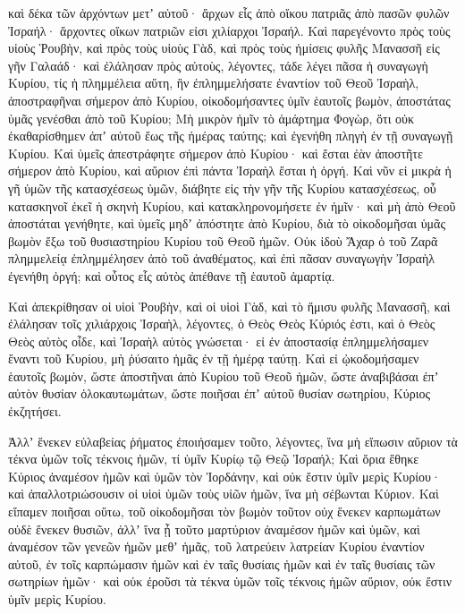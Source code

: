 {καὶ δέκα τῶν ἀρχόντων μετʼ αὐτοῦ· ἄρχων εἷς ἀπὸ οἴκου πατριᾶς ἀπὸ πασῶν φυλῶν Ἰσραήλ· ἄρχοντες οἴκων πατριῶν εἰσι χιλίαρχοι Ἰσραήλ.
Καὶ παρεγένοντο πρὸς τοὺς υἱοὺς Ῥουβὴν, καὶ πρὸς τοὺς υἱοὺς Γὰδ, καὶ πρὸς τοὺς ἡμίσεις φυλῆς Μανασσῆ εἰς γῆν Γαλαάδ· καὶ ἐλάλησαν πρὸς αὐτοὺς, λέγοντες,
τάδε λέγει πᾶσα ἡ συναγωγὴ Κυρίου, τίς ἡ πλημμέλεια αὕτη, ἣν ἐπλημμελήσατε ἐναντίον τοῦ Θεοῦ Ἰσραὴλ, ἀποστραφῆναι σήμερον ἀπὸ Κυρίου, οἰκοδομήσαντες ὑμῖν ἑαυτοῖς βωμὸν, ἀποστάτας ὑμᾶς γενέσθαι ἀπὸ τοῦ Κυρίου;
Μὴ μικρὸν ἡμῖν τὸ ἁμάρτημα Φογὼρ, ὅτι οὐκ ἐκαθαρίσθημεν ἀπʼ αὐτοῦ ἕως τῆς ἡμέρας ταύτης; καὶ ἐγενήθη πληγὴ ἐν τῇ συναγωγῇ Κυρίου.
Καὶ ὑμεῖς ἀπεστράφητε σήμερον ἀπὸ Κυρίου· καὶ ἔσται ἐὰν ἀποστῆτε σήμερον ἀπὸ Κυρίου, καὶ αὔριον ἐπὶ πάντα Ἰσραὴλ ἔσται ἡ ὀργή.
Καὶ νῦν εἰ μικρὰ ἡ γῆ ὑμῶν τῆς κατασχέσεως ὑμῶν, διάβητε εἰς τὴν γῆν τῆς Κυρίου κατασχέσεως, οὗ κατασκηνοῖ ἐκεῖ ἡ σκηνὴ Κυρίου, καὶ κατακληρονομήσετε ἐν ἡμῖν· καὶ μὴ ἀπὸ Θεοῦ ἀποστάται γενήθητε, καὶ ὑμεῖς μηδʼ ἀπόστητε ἀπὸ Κυρίου, διὰ τὸ οἰκοδομῆσαι ὑμᾶς βωμὸν ἔξω τοῦ θυσιαστηρίου Κυρίου τοῦ Θεοῦ ἡμῶν.
Οὐκ ἰδοὺ Ἄχαρ ὁ τοῦ Ζαρᾶ πλημμελείᾳ ἐπλημμέλησεν ἀπὸ τοῦ ἀναθέματος, καὶ ἐπὶ πᾶσαν συναγωγὴν Ἰσραὴλ ἐγενήθη ὀργή; καὶ οὗτος εἷς αὐτὸς ἀπέθανε τῇ ἑαυτοῦ ἁμαρτίᾳ.
\par }{\PP {}Καὶ ἀπεκρίθησαν οἱ υἱοὶ Ῥουβὴν, καὶ οἱ υἱοὶ Γὰδ, καὶ τὸ ἥμισυ φυλῆς Μανασσῆ, καὶ ἐλάλησαν τοῖς χιλιάρχοις Ἰσραὴλ, λέγοντες,
ὁ Θεὸς Θεὸς Κύριός ἐστι, καὶ ὁ Θεὸς Θεὸς αὐτὸς οἶδε, καὶ Ἰσραὴλ αὐτὸς γνώσεται· εἰ ἐν ἀποστασίᾳ ἐπλημμελήσαμεν ἔναντι τοῦ Κυρίου, μὴ ῥύσαιτο ἡμᾶς ἐν τῇ ἡμέρᾳ ταύτῃ.
Καὶ εἰ ᾠκοδομήσαμεν ἑαυτοῖς βωμὸν, ὥστε ἀποστῆναι ἀπὸ Κυρίου τοῦ Θεοῦ ἡμῶν, ὥστε ἀναβιβάσαι ἐπʼ αὐτὸν θυσίαν ὁλοκαυτωμάτων, ὥστε ποιῆσαι ἐπʼ αὐτοῦ θυσίαν σωτηρίου, Κύριος ἐκζητήσει.
\par }{\PP {}Ἀλλʼ ἕνεκεν εὐλαβείας ῥήματος ἐποιήσαμεν τοῦτο, λέγοντες, ἵνα μὴ εἴπωσιν αὔριον τὰ τέκνα ὑμῶν τοῖς τέκνοις ἡμῶν, τί ὑμῖν Κυρίῳ τῷ Θεῷ Ἰσραήλ;
Καὶ ὅρια ἔθηκε Κύριος ἀναμέσον ἡμῶν καὶ ὑμῶν τὸν Ἰορδάνην, καὶ οὐκ ἔστιν ὑμῖν μερὶς Κυρίου· καὶ ἀπαλλοτριώσουσιν οἱ υἱοὶ ὑμῶν τοὺς υἱῶν ἡμῶν, ἵνα μὴ σέβωνται Κύριον.
Καὶ εἴπαμεν ποιῆσαι οὕτω, τοῦ οἰκοδομῆσαι τὸν βωμὸν τοῦτον οὐχ ἕνεκεν καρπωμάτων οὐδὲ ἕνεκεν θυσιῶν,
ἀλλʼ ἵνα ᾖ τοῦτο μαρτύριον ἀναμέσον ἡμῶν καὶ ὑμῶν, καὶ ἀναμέσον τῶν γενεῶν ἡμῶν μεθʼ ἡμᾶς, τοῦ λατρεύειν λατρείαν Κυρίου ἐναντίον αὐτοῦ, ἐν τοῖς καρπώμασιν ἡμῶν καὶ ἐν ταῖς θυσίαις ἡμῶν καὶ ἐν ταῖς θυσίαις τῶν σωτηρίων ἡμῶν· καὶ οὐκ ἐροῦσι τὰ τέκνα ὑμῶν τοῖς τέκνοις ἡμῶν αὔριον, οὐκ ἔστιν ὑμῖν μερὶς Κυρίου.
}
